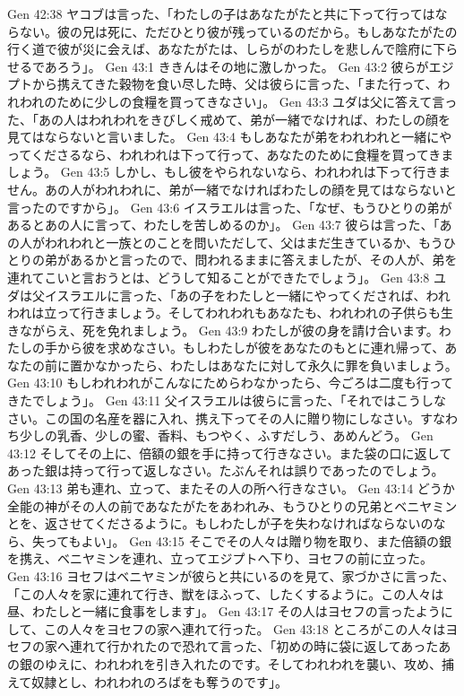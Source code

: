 Gen 42:38  ヤコブは言った、「わたしの子はあなたがたと共に下って行ってはならない。彼の兄は死に、ただひとり彼が残っているのだから。もしあなたがたの行く道で彼が災に会えば、あなたがたは、しらがのわたしを悲しんで陰府に下らせるであろう」。
Gen 43:1  ききんはその地に激しかった。
Gen 43:2  彼らがエジプトから携えてきた穀物を食い尽した時、父は彼らに言った、「また行って、われわれのために少しの食糧を買ってきなさい」。
Gen 43:3  ユダは父に答えて言った、「あの人はわれわれをきびしく戒めて、弟が一緒でなければ、わたしの顔を見てはならないと言いました。
Gen 43:4  もしあなたが弟をわれわれと一緒にやってくださるなら、われわれは下って行って、あなたのために食糧を買ってきましょう。
Gen 43:5  しかし、もし彼をやられないなら、われわれは下って行きません。あの人がわれわれに、弟が一緒でなければわたしの顔を見てはならないと言ったのですから」。
Gen 43:6  イスラエルは言った、「なぜ、もうひとりの弟があるとあの人に言って、わたしを苦しめるのか」。
Gen 43:7  彼らは言った、「あの人がわれわれと一族とのことを問いただして、父はまだ生きているか、もうひとりの弟があるかと言ったので、問われるままに答えましたが、その人が、弟を連れてこいと言おうとは、どうして知ることができたでしょう」。
Gen 43:8  ユダは父イスラエルに言った、「あの子をわたしと一緒にやってくだされば、われわれは立って行きましょう。そしてわれわれもあなたも、われわれの子供らも生きながらえ、死を免れましょう。
Gen 43:9  わたしが彼の身を請け合います。わたしの手から彼を求めなさい。もしわたしが彼をあなたのもとに連れ帰って、あなたの前に置かなかったら、わたしはあなたに対して永久に罪を負いましょう。
Gen 43:10  もしわれわれがこんなにためらわなかったら、今ごろは二度も行ってきたでしょう」。
Gen 43:11  父イスラエルは彼らに言った、「それではこうしなさい。この国の名産を器に入れ、携え下ってその人に贈り物にしなさい。すなわち少しの乳香、少しの蜜、香料、もつやく、ふすだしう、あめんどう。
Gen 43:12  そしてその上に、倍額の銀を手に持って行きなさい。また袋の口に返してあった銀は持って行って返しなさい。たぶんそれは誤りであったのでしょう。
Gen 43:13  弟も連れ、立って、またその人の所へ行きなさい。
Gen 43:14  どうか全能の神がその人の前であなたがたをあわれみ、もうひとりの兄弟とベニヤミンとを、返させてくださるように。もしわたしが子を失わなければならないのなら、失ってもよい」。
Gen 43:15  そこでその人々は贈り物を取り、また倍額の銀を携え、ベニヤミンを連れ、立ってエジプトへ下り、ヨセフの前に立った。
Gen 43:16  ヨセフはベニヤミンが彼らと共にいるのを見て、家づかさに言った、「この人々を家に連れて行き、獣をほふって、したくするように。この人々は昼、わたしと一緒に食事をします」。
Gen 43:17  その人はヨセフの言ったようにして、この人々をヨセフの家へ連れて行った。
Gen 43:18  ところがこの人々はヨセフの家へ連れて行かれたので恐れて言った、「初めの時に袋に返してあったあの銀のゆえに、われわれを引き入れたのです。そしてわれわれを襲い、攻め、捕えて奴隷とし、われわれのろばをも奪うのです」。
